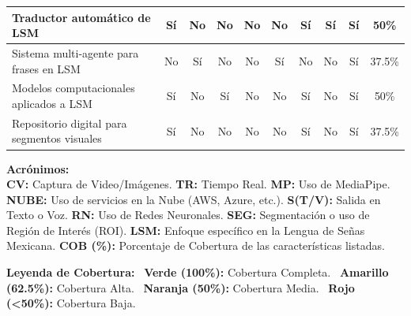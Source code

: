 \begin{table}[H]
\begin{tabular}{|p{4.5cm}|c|c|c|c|c|c|c|c|c|}
        Traductor automático de LSM                    & Sí & No & No & No & No & Sí & Sí & Sí & \cellcolor[rgb]{1.0, 0.8, 0.6} 50\% \\ \hline
        Sistema multi-agente para frases en LSM        & No & Sí & No & No & Sí & No & No & Sí & \cellcolor[rgb]{1.0, 0.7, 0.7} 37.5\% \\ \hline
        Modelos computacionales aplicados a LSM        & Sí & No & Sí & No & No & Sí & No & Sí & \cellcolor[rgb]{1.0, 0.8, 0.6} 50\% \\ \hline
        Repositorio digital para segmentos visuales    & Sí & No & No & No & No & Sí & No & Sí & \cellcolor[rgb]{1.0, 0.7, 0.7} 37.5\% \\ \hline
    \end{tabular}

    \begin{flushleft}
        \footnotesize
        \vspace{1ex}
        \textbf{Acrónimos:} \\
        \textbf{CV:} Captura de Video/Imágenes. \textbf{TR:} Tiempo Real. \textbf{MP:} Uso de MediaPipe. \textbf{NUBE:} Uso de servicios en la Nube (AWS, Azure, etc.). \textbf{S(T/V):} Salida en Texto o Voz. \textbf{RN:} Uso de Redes Neuronales. \textbf{SEG:} Segmentación o uso de Región de Interés (ROI). \textbf{LSM:} Enfoque específico en la Lengua de Señas Mexicana. \textbf{COB (\%):} Porcentaje de Cobertura de las características listadas.

        \vspace{1ex}
        \textbf{Leyenda de Cobertura:} \
        \textcolor[rgb]{0.0, 0.5, 0.0}{\textbf{Verde (100\%):}} Cobertura Completa. \
        \textcolor[rgb]{0.8, 0.8, 0.0}{\textbf{Amarillo (62.5\%):}} Cobertura Alta. \
        \textcolor[rgb]{1.0, 0.5, 0.0}{\textbf{Naranja (50\%):}} Cobertura Media. \
        \textcolor[rgb]{0.8, 0.0, 0.0}{\textbf{Rojo (<50\%):}} Cobertura Baja.
    \end{flushleft}

    \label{tab:comparativa_proyectos}
\end{table}

